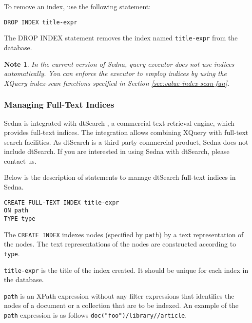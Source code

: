\documentclass[a4paper,12pt]{article}
\newtheorem{note}{Note}
\begin{document}
To remove an index, use the following statement:
\begin{verbatim}
DROP INDEX title-expr
\end{verbatim}

The DROP INDEX statement removes the index named \verb!title-expr! from the database.

\begin{note}In the current version of Sedna, query executor does not use indices automatically. You can enforce the executor to employ indices by
using the XQuery index-scan functions specified in Section \ref{sec:value-index-scan-fun}.
\end{note}




\subsubsection{Managing Full-Text Indices}
\label{sec:managing-ft-indices}
Sedna is integrated with dtSearch \cite{link:dtsearch-engine}, a commercial text retrieval engine, which provides full-text indices. The integration allows combining XQuery with full-text search facilities. As dtSearch is a third party commercial product, Sedna does not include dtSearch. If you are interested in using Sedna with dtSearch, please contact us.

Below is the description of statements to manage dtSearch full-text indices in Sedna.

\begin{verbatim}
CREATE FULL-TEXT INDEX title-expr
ON path
TYPE type
\end{verbatim}

The \verb!CREATE INDEX! indexes nodes (specified by \verb!path!) by a text representation of the nodes. The text representations of the nodes are constructed according to \verb!type!.

\verb!title-expr! is the title of the index created. It should be unique for each index in the database.

\verb!path! is an XPath expression without any filter expressions that identifies the nodes of a document or a collection that are to be indexed. An example of the \verb!path! expression is as follows \verb!doc("foo")/library//article!.
\end{document}
